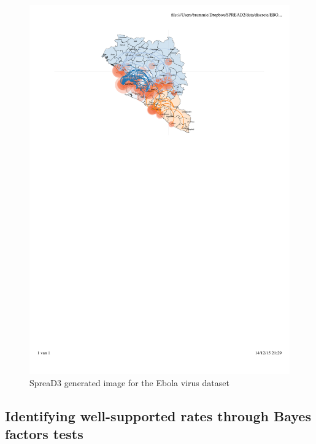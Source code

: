 \documentclass[english]{paper}
\def \spreadname {SpreaD3}
\begin{document}
\begin{figure}%
\centering
\includegraphics[width=1\textwidth]{./figures/Fig6_ebov.pdf} %
\caption{{\spreadname} generated image for the Ebola virus dataset}
\label{fig:ebov_final}
\end{figure}


\subsection{Identifying well-supported rates through Bayes factors tests}
\label{BayesFactor}
\end{document}
